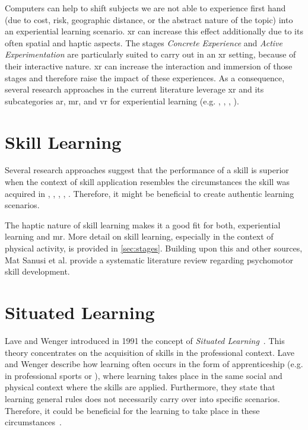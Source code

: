 Computers can help to shift subjects we are not able to experience first hand (due to cost, risk, geographic distance, or the abstract nature of the topic) into an experiential learning scenario. \Acrfull{xr} can increase this effect additionally due to its often spatial and haptic aspects.
The stages \emph{Concrete Experience} and \emph{Active Experimentation} are particularly suited to carry out in an \acrshort{xr} setting, because of their interactive nature. \acrshort{xr} can increase the interaction and immersion of those stages and therefore raise the impact of these experiences.
As a consequence, several research approaches in the current literature leverage \acrshort{xr} and its subcategories \acrshort{ar}, \acrshort{mr}, and \acrshort{vr} for experiential learning (e.g. \cite{asad2021virtual}, \cite{majgaard2020virtual}, \cite{wang2007experiential}, \cite{pueschel:2013:MRCG}).

\section{Skill Learning \label{sec:skill}}
Several research approaches suggest that the performance of a skill is superior when the context of skill application resembles the circumstances the skill was acquired in \cite{godden1975context}, \cite{ruitenberg2012context}, \cite{smith2001environmental}, \cite{anderson1998contextual}, \cite{wright1991contextual}. Therefore, it might be beneficial to create authentic learning scenarios.

The haptic nature of skill learning makes it a good fit for both, experiential learning and \acrshort{mr}. More detail on skill learning, especially in the context of physical activity, is provided in \autoref{sec:stages}. Building upon this and other sources, Mat Sanusi et al. \cite{mat2025virtual} provide a systematic literature review regarding psychomotor skill development.

\section{Situated Learning \label{sec:situated}}
Lave and Wenger introduced in 1991 the concept of \emph{Situated Learning}~\cite{lave:wenger:1991}. This theory concentrates on the acquisition of skills in the professional context. Lave and Wenger describe how learning often occurs in the form of apprenticeship (e.g. in professional sports or ), where learning takes place in the same social and physical context where the skills are applied. Furthermore, they state that learning general rules does not necessarily carry over into specific scenarios. Therefore, it could be beneficial for the learning to take place in these circumstances~\cite[p. 34]{lave:wenger:1991}.